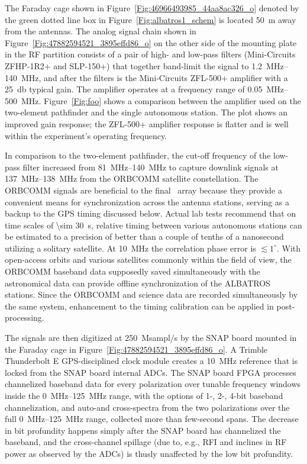 The Faraday cage shown in Figure~\ref{Fig:46966493985_44aa8ac326_o} denoted by the green dotted line box in Figure~\ref{Fig:albatros1_schem} is located \SI{50}{\meter} away from the antennas. The analog signal chain shown in Figure~\ref{Fig:47882594521_3895effd86_o} on the other side of the mounting plate in the RF partition consists of a pair of high- and low-pass filters (Mini-Circuits ZFHP-1R2+ and SLP-150+) that together band-limit the signal to \SIrange{1.2}{140}{\mega\hertz}, and after the filters is the Mini-Circuits ZFL-500+ amplifier with a \SI{25}{\decibel} typical gain. The amplifier operates at a frequency range of \SIrange{0.05}{500}{\mega\hertz}. Figure~\ref{Fig:foo} shows a comparison between the amplifier used on the two-element pathfinder and the single autonomous station. The plot shows an improved gain response; the ZFL-500+ amplifier response is flatter and is well within the experiment's operating frequency.

In comparison to the two-element pathfinder, the cut-off frequency of the low-pass filter increased from \SIrange{81}{140}{\mega\hertz} to capture downlink signals at \SIrange{137}{138}{\mega\hertz} from the ORBCOMM satellite constellation. The ORBCOMM signals are beneficial to the final \albatros\ array because they provide a convenient means for synchronization across the antenna stations, serving as a backup to the GPS timing discussed below. Actual lab tests recommend that on time scales of \SI{\sim 30}{\second}, relative timing between various autonomous stations can be estimated to a precision of better than a couple of tenths of a nanosecond utilizing a solitary satellite. At \SI{10}{\mega\hertz} the correlation phase error is $\lesssim1^\circ$. With open-access orbits and various satellites commonly within the field of view, the ORBCOMM baseband data supposedly saved simultaneously with the astronomical data can provide offline synchronization of the ALBATROS stations. Since the ORBCOMM and science data are recorded simultaneously by the same system, enhancement to the timing calibration can be applied in post-processing.

The signals are then digitized at \SI{250}{Msampl/s} by the SNAP board mounted in the Faraday cage in Figure~\ref{Fig:47882594521_3895effd86_o}. A Trimble Thunderbolt E GPS-disciplined clock module creates a \SI{10}{\mega\hertz} reference that is locked from the SNAP board internal ADCs. The SNAP board FPGA processes channelized baseband data for every polarization over tunable frequency windows inside the \SIrange{0}{125}{\mega\hertz} range, with the options of 1-, 2-, 4-bit baseband channelization, and auto-and cross-spectra from the two polarizations over the full \SIrange{0}{125}{\mega\hertz} range, collected more than few-second spans. The decrease in bit profundity happens simply after the SNAP board has channelized the baseband, and the cross-channel spillage (due to, e.g., RFI and inclines in RF power as observed by the ADCs) is thusly unaffected by the low bit profundity. 

